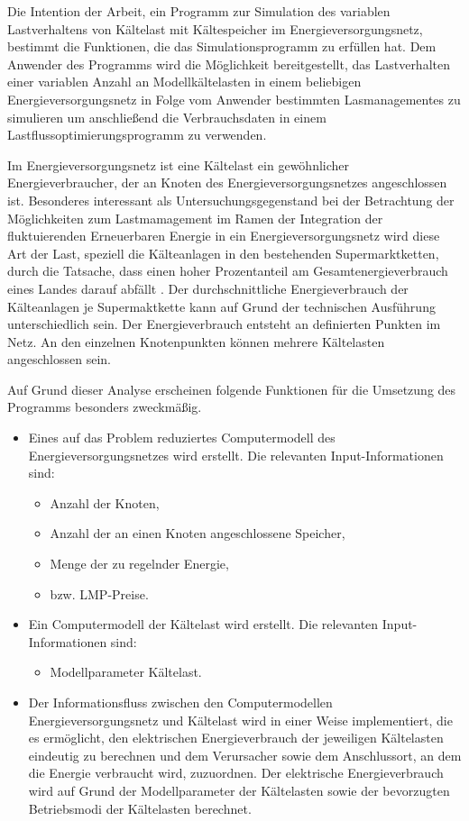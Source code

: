 Die Intention der Arbeit, ein Programm zur Simulation des variablen
Lastverhaltens von Kältelast mit Kältespeicher im Energieversorgungsnetz,
bestimmt die Funktionen, die das Simulationsprogramm zu erfüllen hat. Dem
Anwender des Programms wird die Möglichkeit bereitgestellt, das Lastverhalten
einer variablen Anzahl an Modellkältelasten in einem beliebigen
Energieversorgungsnetz in Folge vom Anwender bestimmten Lasmanagementes zu
simulieren um anschließend die Verbrauchsdaten in einem
Lastflussoptimierungsprogramm zu verwenden.


Im Energieversorgungsnetz ist eine Kältelast ein gewöhnlicher
Energieverbraucher, der an Knoten des Energieversorgungsnetzes angeschlossen
ist. Besonderes interessant als Untersuchungsgegenstand bei der Betrachtung der
Möglichkeiten zum Lastmamagement im Ramen der Integration der fluktuierenden
Erneuerbaren Energie in ein Energieversorgungsnetz wird diese Art der Last,
speziell die Kälteanlagen in den bestehenden Supermarktketten, durch die
Tatsache, dass einen hoher Prozentanteil am Gesamtenergieverbrauch eines Landes
darauf abfällt \cite{doctor}. Der durchschnittliche
Energieverbrauch der Kälteanlagen je Supermaktkette kann auf Grund der
technischen Ausführung unterschiedlich sein. Der Energieverbrauch entsteht an
definierten Punkten im Netz. An den einzelnen Knotenpunkten können mehrere
Kältelasten angeschlossen sein.

Auf Grund dieser Analyse erscheinen folgende Funktionen für die Umsetzung des
Programms besonders zweckmäßig.

\begin{itemize}
	\item Eines auf das Problem reduziertes Computermodell des
	Energieversorgungsnetzes wird erstellt. Die relevanten
	Input-Informationen sind:
	\begin{itemize}
		\item Anzahl der Knoten,
		\item Anzahl der an einen Knoten angeschlossene Speicher,
		\item Menge der zu regelnder Energie,
		\item bzw. LMP-Preise.
	\end{itemize}
	\item Ein Computermodell der Kältelast wird erstellt. Die relevanten
	Input-Informationen sind:
	\begin{itemize}
		\item Modellparameter Kältelast.
	\end{itemize}
	\item Der Informationsfluss zwischen den Computermodellen
	Energieversorgungsnetz und Kältelast wird in einer Weise implementiert,
	die es ermöglicht, den elektrischen Energieverbrauch der jeweiligen
	Kältelasten eindeutig zu berechnen und dem Verursacher sowie dem
	Anschlussort, an dem die Energie verbraucht wird, zuzuordnen. Der
	elektrische Energieverbrauch wird auf Grund der Modellparameter der
	Kältelasten sowie der bevorzugten Betriebsmodi der Kältelasten
	berechnet.
\end{itemize}

